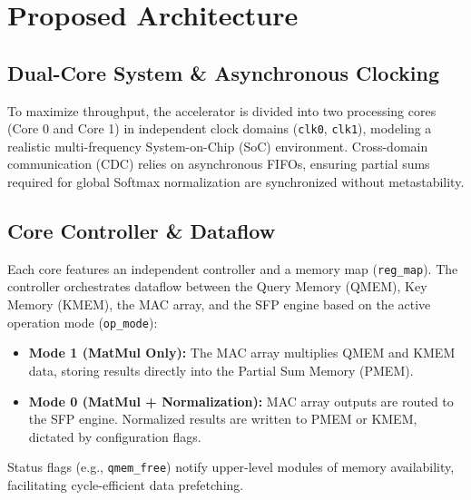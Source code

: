 \documentclass[journal]{IEEEtran}
\begin{document}
\section{Proposed Architecture}

\subsection{Dual-Core System \& Asynchronous Clocking}
To maximize throughput, the accelerator is divided into two processing cores (Core 0 and Core 1) in independent clock domains (\texttt{clk0}, \texttt{clk1}), modeling a realistic multi-frequency System-on-Chip (SoC) environment. Cross-domain communication (CDC) relies on asynchronous FIFOs, ensuring partial sums required for global Softmax normalization are synchronized without metastability.

\subsection{Core Controller \& Dataflow}
Each core features an independent controller and a memory map (\texttt{reg\_map}). The controller orchestrates dataflow between the Query Memory (QMEM), Key Memory (KMEM), the MAC array, and the SFP engine based on the active operation mode (\texttt{op\_mode}):
\begin{itemize}
    \item \textbf{Mode 1 (MatMul Only):} The MAC array multiplies QMEM and KMEM data, storing results directly into the Partial Sum Memory (PMEM).
    \item \textbf{Mode 0 (MatMul + Normalization):} MAC array outputs are routed to the SFP engine. Normalized results are written to PMEM or KMEM, dictated by configuration flags.
\end{itemize}
Status flags (e.g., \texttt{qmem\_free}) notify upper-level modules of memory availability, facilitating cycle-efficient data prefetching.
\end{document}
